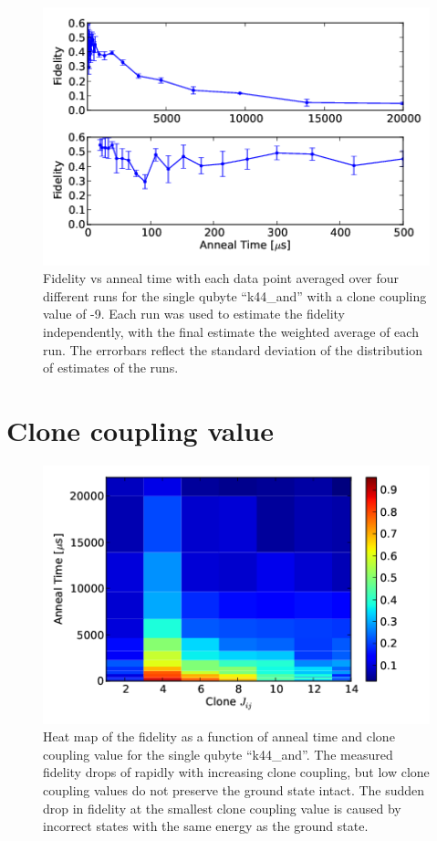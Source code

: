 \begin{figure}
	\includegraphics{img/final_single_k44.png}
	\caption[Averaged Anneal Results]{Fidelity vs anneal time with each data point averaged over four different runs for the single qubyte ``k44\_and'' with a clone coupling value of -9.  Each run was used to estimate the fidelity independently, with the final estimate the weighted average of each run.  The errorbars reflect the standard deviation of the distribution of estimates of the runs.}
	\label{fig:results_avg}
\end{figure}




\section{Clone coupling value}
\label{sec:coupling}

\begin{figure}
	\includegraphics{img/n_8_t_v_c.png}
	\caption[Variable Clone Coupling Fidelity]{Heat map of the fidelity as a function of anneal time and clone coupling value for the single qubyte ``k44\_and''.  The measured fidelity drops of rapidly with increasing clone coupling, but low clone coupling values do not preserve the ground state intact.  The sudden drop in fidelity at the smallest clone coupling value is caused by incorrect states with the same energy as the ground state.}
	\label{fig:clone_coupling}
\end{figure}

